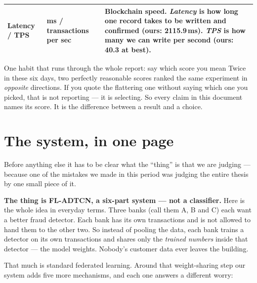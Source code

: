 \documentclass[11pt]{article}
\begin{document}
\begin{center}
\begin{tabularx}{\linewidth}{@{}p{3.1cm} p{2.6cm} X@{}}
\textbf{Latency / TPS} & ms / transactions per sec & Blockchain speed. \emph{Latency} is how long one record takes to be written and confirmed (ours: 2115.9\,ms). \emph{TPS} is how many we can write per second (ours: 40.3 at best). \\
\bottomrule
\end{tabularx}
\end{center}

\begin{keybox}{One habit that runs through the whole report: say which score you mean}
Twice in these six days, two perfectly reasonable scores ranked the same experiment in \emph{opposite}
directions. If you quote the flattering one without saying which one you picked, that is not reporting
--- it is selecting. So every claim in this document names its score. It is the difference between a
result and a choice.
\end{keybox}

\section{The system, in one page}

Before anything else it has to be clear what the ``thing'' is that we are judging --- because one of
the mistakes we made in this period was judging the entire thesis by one small piece of it.

\textbf{The thing is FL-ADTCN, a six-part system --- not a classifier.} Here is the whole idea in
everyday terms. Three banks (call them A, B and C) each want a better fraud detector. Each bank has its
own transactions and is not allowed to hand them to the other two. So instead of pooling the data, each
bank trains a detector on its own transactions and shares only the \emph{trained numbers} inside that
detector --- the model weights. Nobody's customer data ever leaves the building.

That much is standard federated learning. Around that weight-sharing step our system adds five more
mechanisms, and each one answers a different worry:
\end{document}

